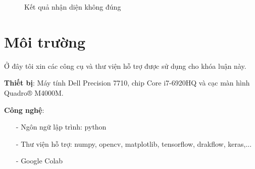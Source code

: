 \begin{figure}[H]
 \centering
\caption{Kết quả nhận diện không đúng}
\end{figure}
\section{Môi trường}
Ở đây tôi xin các công cụ và thư viện hỗ trợ được sử dụng cho khóa luận này.\\ \par
\textbf{Thiết bị}: Máy tính Dell Precision 7710, chip Core i7-6920HQ và cạc màn hình Quadro® M4000M.\\ \par
\textbf{Công nghệ}:
\hspace{5mm}
\begin{itemize}
\item[-]Ngôn ngữ lập trình: python
\item[-]Thư viện hỗ trợ: numpy, opencv, matplotlib, tensorflow, drakflow, keras,...
\item[-]Google Colab
\end{itemize}


